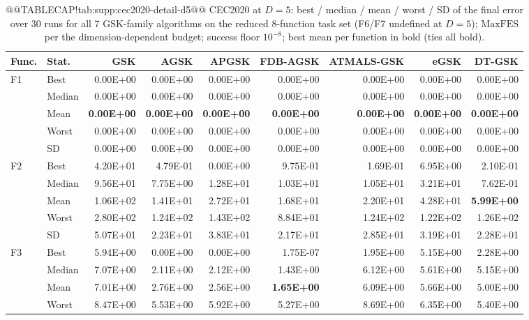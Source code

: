 \documentclass[10pt,a4paper]{article}
\newcommand{\bestval}[1]{\textbf{#1}}
\begin{document}
\begin{table}[p]
\caption{@@TABLECAP!tab:supp:cec2020-detail-d5@@ CEC2020 at $D = 5$: best / median / mean / worst / SD of
the final error over 30 runs for all 7 GSK-family algorithms
on the reduced 8-function task set (F6/F7 undefined at $D = 5$);
$\mathrm{MaxFES}$ per the dimension-dependent budget; success floor
$10^{-8}$; best mean per function in bold (ties all bold).
}\label{tab:supp:cec2020-detail-d5}


\zebra
\begin{tabular}{llrrrrrrr}
\toprule
\textbf{Func.} & \textbf{Stat.} & \textbf{GSK} & \textbf{AGSK} & \textbf{APGSK} & \textbf{FDB-AGSK} & \textbf{ATMALS-GSK} & \textbf{eGSK} & \textbf{DT-GSK} \\
\midrule
F1 & Best & 0.00E+00 & 0.00E+00 & 0.00E+00 & 0.00E+00 & 0.00E+00 & 0.00E+00 & 0.00E+00 \\
 & Median & 0.00E+00 & 0.00E+00 & 0.00E+00 & 0.00E+00 & 0.00E+00 & 0.00E+00 & 0.00E+00 \\
 & Mean & \bestval{0.00E+00} & \bestval{0.00E+00} & \bestval{0.00E+00} & \bestval{0.00E+00} & \bestval{0.00E+00} & \bestval{0.00E+00} & \bestval{0.00E+00} \\
 & Worst & 0.00E+00 & 0.00E+00 & 0.00E+00 & 0.00E+00 & 0.00E+00 & 0.00E+00 & 0.00E+00 \\
 & SD & 0.00E+00 & 0.00E+00 & 0.00E+00 & 0.00E+00 & 0.00E+00 & 0.00E+00 & 0.00E+00 \\
\midrule
F2 & Best & 4.20E+01 & 4.79E-01 & 0.00E+00 & 9.75E-01 & 1.69E-01 & 6.95E+00 & 2.10E-01 \\
 & Median & 9.56E+01 & 7.75E+00 & 1.28E+01 & 1.03E+01 & 1.05E+01 & 3.21E+01 & 7.62E-01 \\
 & Mean & 1.06E+02 & 1.41E+01 & 2.72E+01 & 1.68E+01 & 2.20E+01 & 4.28E+01 & \bestval{5.99E+00} \\
 & Worst & 2.80E+02 & 1.24E+02 & 1.43E+02 & 8.84E+01 & 1.24E+02 & 1.22E+02 & 1.26E+02 \\
 & SD & 5.07E+01 & 2.23E+01 & 3.83E+01 & 2.17E+01 & 2.85E+01 & 3.19E+01 & 2.28E+01 \\
\midrule
F3 & Best & 5.94E+00 & 0.00E+00 & 0.00E+00 & 1.75E-07 & 1.95E+00 & 5.15E+00 & 2.28E+00 \\
 & Median & 7.07E+00 & 2.11E+00 & 2.12E+00 & 1.43E+00 & 6.12E+00 & 5.61E+00 & 5.15E+00 \\
 & Mean & 7.01E+00 & 2.76E+00 & 2.56E+00 & \bestval{1.65E+00} & 6.09E+00 & 5.66E+00 & 5.00E+00 \\
 & Worst & 8.47E+00 & 5.53E+00 & 5.92E+00 & 5.27E+00 & 8.69E+00 & 6.35E+00 & 5.40E+00 \\

\end{tabular}
\end{table}
\end{document}
